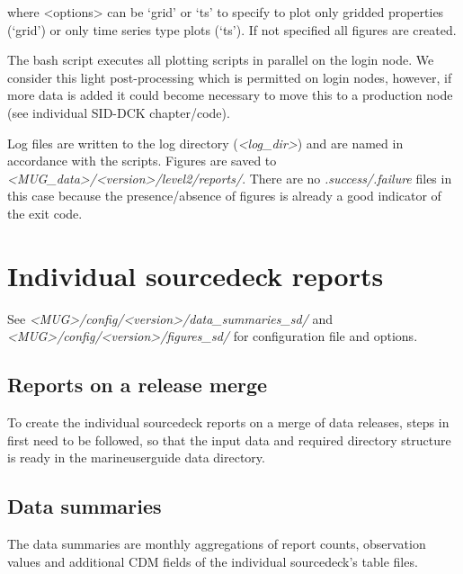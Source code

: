\documentclass[letterpaper,10pt,english]{sphinxmanual}
\begin{document}
where <options> can be `grid' or `ts' to specify to plot only gridded properties (`grid') or only time series type plots (`ts'). If not specified all figures are created.

The bash script executes all plotting scripts in parallel on the login node. 
We consider this light post-processing which is permitted on login nodes, however, if more data is added it could become necessary to move this to a production node (see individual SID-DCK chapter/code).

Log files are written to the log directory (\textit{<log\_dir>}) and are named in accordance with the scripts.
Figures are saved to \textit{<MUG\_data>/<version>/level2/reports/}. 
There are no \textit{.success/.failure} files in this case because the presence/absence of figures is already a good indicator of the exit code.

\chapter{Individual source\sphinxhyphen{}deck reports}
\label{\detokenize{index:individual-source-deck-reports}}\label{\detokenize{index:source-deck-reports}}
See \textit{<MUG>/config/<version>/data\_summaries\_sd/} and \textit{<MUG>/config/<version>/figures\_sd/} for configuration file and options.



\section{Reports on a release merge}
\label{\detokenize{index:reports-on-a-release-merge}}
To create the individual source\sphinxhyphen{}deck reports on a merge of data releases, steps
in {\hyperref[\detokenize{index:init-mug}]{}} first need to be followed, so that the input data and
required directory structure is ready in the marine\sphinxhyphen{}user\sphinxhyphen{}guide data directory.


\section{Data summaries}
\label{\detokenize{index:data-data-summaries}}
The data summaries are monthly aggregations of report counts, observation values and additional CDM fields of the individual source\sphinxhyphen{}deck’s table files.
\end{document}
